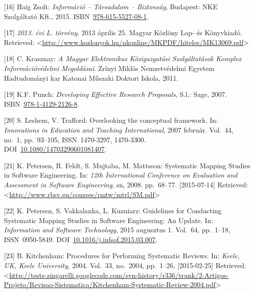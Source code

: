 \documentclass[12pt,magyar,a4paper,oneside]{scrreprt}
\newenvironment{cslreferences}%
  {}%
  {\par}
\begin{document}
\begin{cslreferences}
\leavevmode\hypertarget{ref-haig_zsolt_informacio_2015}{}%
{[}16{]} Haig Zsolt: \emph{Információ -- Társadalom -- Biztonság},
Budapest: NKE Szolgáltató Kft., 2015.
ISBN~\href{https://worldcat.org/isbn/978-615-5527-08-1}{978-615-5527-08-1}.

\leavevmode\hypertarget{ref-noauthor_2013._2013}{}%
{[}17{]} \emph{2013. évi L. törvény}. 2013 április 25. Magyar Közlöny
Lap- és Könyvkiadó. Retrieved:
\textless{}\url{http://www.kozlonyok.hu/nkonline/MKPDF/hiteles/MK13069.pdf}\textgreater{}

\leavevmode\hypertarget{ref-krasznay_magyar_2011}{}%
{[}18{]} C. Krasznay: \emph{A Magyar Elektronikus Közigazgatási
Szolgáltatások Komplex Információvédelmi Megoldásai}. Zrínyi Miklós
Nemzetvédelmi Egyetem Hadtudományi kar Katonai Műszaki Doktori Iskola,
2011.

\leavevmode\hypertarget{ref-punch_developing_2007}{}%
{[}19{]} K.F. Punch: \emph{Developing Effective Research Proposals},
S.l.: Sage, 2007.
ISBN~\href{https://worldcat.org/isbn/978-1-4129-2126-8}{978-1-4129-2126-8}.

\leavevmode\hypertarget{ref-leshem_overlooking_2007}{}%
{[}20{]} S. Leshem, V. Trafford: Overlooking the conceptual framework.
In: \emph{Innovations in Education and Teaching International}, 2007
február. Vol.~44, no.~1, pp.~93--105, ISSN~1470-3297, 1470-3300.
DOI~\href{https://doi.org/10.1080/14703290601081407}{10.1080/14703290601081407}.

\leavevmode\hypertarget{ref-petersen_systematic_2008}{}%
{[}21{]} K. Petersen, R. Feldt, S. Mujtaba, M. Mattsson: Systematic
Mapping Studies in Software Engineering. In: \emph{12th International
Conference on Evaluation and Assessment in Software Engineering}, sn,
2008. pp.~68--77. {[}2015-07-14{]} Retrieved:
\textless{}\url{http://www.rbsv.eu/courses/rmtw/mtrl/SM.pdf}\textgreater{}

\leavevmode\hypertarget{ref-petersen_guidelines_2015}{}%
{[}22{]} K. Petersen, S. Vakkalanka, L. Kuzniarz: Guidelines for
Conducting Systematic Mapping Studies in Software Engineering: An
Update. In: \emph{Information and Software Technology}, 2015 augusztus
1. Vol.~64, pp.~1--18, ISSN~0950-5849.
DOI~\href{https://doi.org/10.1016/j.infsof.2015.03.007}{10.1016/j.infsof.2015.03.007}.

\leavevmode\hypertarget{ref-kitchenham_procedures_2004}{}%
{[}23{]} B. Kitchenham: Procedures for Performing Systematic Reviews.
In: \emph{Keele, UK, Keele University}, 2004. Vol.~33, no.~2004,
pp.~1--26, {[}2015-02-25{]} Retrieved:
\textless{}\url{http://tests-zingarelli.googlecode.com/svn-history/r336/trunk/2-Artigos-Projeto/Revisao-Sistematica/Kitchenham-Systematic-Review-2004.pdf}\textgreater{}


\end{cslreferences}
\end{document}

